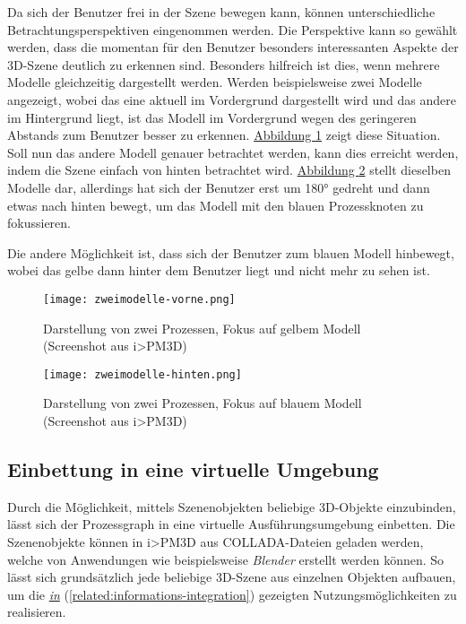 \documentclass[a4paper,10pt]{sphinxmanual}
\begin{document}
Da sich der Benutzer frei in der Szene bewegen kann, können unterschiedliche Betrachtungsperspektiven eingenommen werden.
Die Perspektive kann so gewählt werden, dass die momentan für den Benutzer besonders interessanten Aspekte der 3D-Szene deutlich zu erkennen sind.
Besonders hilfreich ist dies, wenn mehrere Modelle gleichzeitig dargestellt werden.
Werden beispielsweise zwei Modelle angezeigt, wobei das eine aktuell im Vordergrund dargestellt wird und das andere im Hintergrund liegt, ist das Modell im Vordergrund wegen des geringeren Abstands zum Benutzer besser zu erkennen.
\hyperref[visualisierung:zweimodelle-vorne]{Abbildung  \ref*{visualisierung:zweimodelle-vorne}} zeigt diese Situation.
Soll nun das andere Modell genauer betrachtet werden, kann dies erreicht werden, indem die Szene einfach von hinten betrachtet wird.
\hyperref[visualisierung:zweimodelle-hinten]{Abbildung  \ref*{visualisierung:zweimodelle-hinten}} stellt dieselben Modelle dar, allerdings hat sich der Benutzer erst um 180° gedreht und dann etwas nach hinten bewegt, um das Modell mit den blauen Prozessknoten zu fokussieren.

Die andere Möglichkeit ist, dass sich der Benutzer zum blauen Modell hinbewegt, wobei das gelbe dann hinter dem Benutzer liegt und nicht mehr zu sehen ist.
\begin{figure}[htbp]
\centering
\capstart

\texttt{[image: zweimodelle-vorne.png]}
\caption{Darstellung von zwei Prozessen, Fokus auf gelbem Modell (Screenshot aus i\textgreater{}PM3D)}\label{visualisierung:zweimodelle-vorne}\end{figure}
\begin{figure}[htbp]
\centering
\capstart

\texttt{[image: zweimodelle-hinten.png]}
\caption{Darstellung von zwei Prozessen, Fokus auf blauem Modell (Screenshot aus i\textgreater{}PM3D)}\label{visualisierung:zweimodelle-hinten}\end{figure}


\subsection{Einbettung in eine virtuelle Umgebung}
\label{visualisierung:einbettung-in-eine-virtuelle-umgebung}
Durch die Möglichkeit, mittels Szenenobjekten beliebige 3D-Objekte einzubinden, lässt sich der Prozessgraph in eine virtuelle Ausführungsumgebung einbetten.
Die Szenenobjekte können in i\textgreater{}PM3D aus COLLADA-Dateien geladen werden, welche von Anwendungen wie beispielsweise \emph{Blender} \cite{www:blender} erstellt werden können.
So lässt sich grundsätzlich jede beliebige 3D-Szene aus einzelnen Objekten aufbauen, um die {\hyperref[related:informations-integration]{\emph{in}}} (\autoref*{related:informations-integration}) gezeigten Nutzungsmöglichkeiten zu realisieren.
\end{document}
